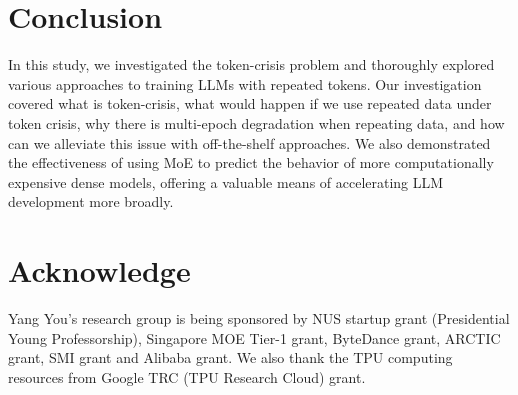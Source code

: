 \documentclass{article}
\begin{document}





\section{Conclusion}

In this study, we investigated the token-crisis problem and thoroughly explored various approaches to training LLMs with repeated tokens. Our investigation covered what is token-crisis, what would happen if we use repeated data under token crisis, why there is multi-epoch degradation when repeating data, and how can we alleviate this issue with off-the-shelf approaches. We also demonstrated the effectiveness of using MoE to predict the behavior of more computationally expensive dense models, offering a valuable means of accelerating LLM development more broadly.

\section*{Acknowledge}

Yang You's research group is being sponsored by NUS startup grant (Presidential Young Professorship), Singapore MOE Tier-1 grant, ByteDance grant, ARCTIC grant, SMI grant and Alibaba grant. We also thank the TPU computing resources from Google TRC (TPU Research Cloud) grant.

\end{document}
